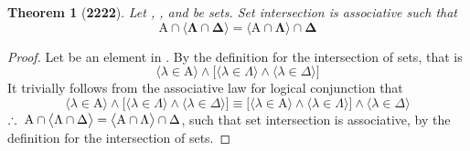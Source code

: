 \documentclass[preview]{standalone}
\newtheorem{theorem}{Theorem}
\begin{document}
\begin{theorem}[\textbf{2222}]
    Let , \bm{$\Lambda$}, and \bm{$\Delta$} be sets. 
    Set intersection is associative such that
    \begin{equation*}
        \bm{
            \mathrm{A} 
                \cap 
            \big \langle \Lambda \cap \Delta \big \rangle 
                = 
            \big \langle \mathrm{A} \cap \Lambda \big \rangle
                \cap 
            \Delta
        }
\end{equation*}
\end{theorem}
\begin{proof}
    Let \bm{$\lambda$} be an element in 
    . 
    By the definition for the intersection of sets, that is 
    \begin{equation*}
        \Big \langle \lambda \in \mathrm{A} \Big \rangle
            \land
        \bigg[
            \Big \langle \lambda \in \Lambda \Big \rangle
                \land
            \Big \langle \lambda \in \Delta \Big \rangle
        \bigg]
    \end{equation*}
    It trivially follows from the associative law for logical conjunction that
    \begin{equation*}
        \Big \langle \lambda \in \mathrm{A} \Big \rangle
            \land
        \bigg[
            \Big \langle \lambda \in \Lambda \Big \rangle
                \land
            \Big \langle \lambda \in \Delta \Big \rangle
        \bigg]
            \equiv
        \bigg[
            \Big \langle \lambda \in \mathrm{A} \Big \rangle
                \land
            \Big \langle \lambda \in \Lambda \Big \rangle
        \bigg]
            \land
        \Big \langle \lambda \in \Delta \Big \rangle
    \end{equation*}
    $
    \therefore \text{\space} \relax{
    \mathrm{A} 
        \cap 
    \big \langle \Lambda \cap \Delta \big \rangle 
        = 
    \big \langle \mathrm{A} \cap \Lambda \big \rangle
        \cap 
    \Delta
    }$,
    such that set intersection is associative,
    by the definition for the intersection of sets.
\end{proof}
\end{document}
